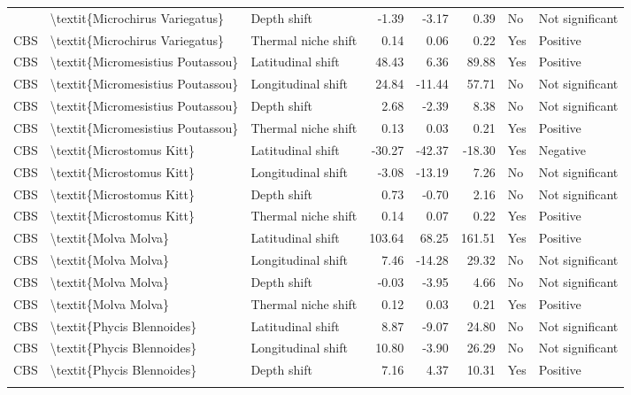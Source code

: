 \begin{longtable}[t]{lllrrrll}
{{CBS & \textbackslash{}textit\{Microchirus Variegatus\} & Depth shift & -1.39 & -3.17 & 0.39 & No & Not significant\\
CBS & \textbackslash{}textit\{Microchirus Variegatus\} & Thermal niche shift & 0.14 & 0.06 & 0.22 & Yes & Positive\\
CBS & \textbackslash{}textit\{Micromesistius Poutassou\} & Latitudinal shift & 48.43 & 6.36 & 89.88 & Yes & Positive\\
CBS & \textbackslash{}textit\{Micromesistius Poutassou\} & Longitudinal shift & 24.84 & -11.44 & 57.71 & No & Not significant\\
\addlinespace
CBS & \textbackslash{}textit\{Micromesistius Poutassou\} & Depth shift & 2.68 & -2.39 & 8.38 & No & Not significant\\
CBS & \textbackslash{}textit\{Micromesistius Poutassou\} & Thermal niche shift & 0.13 & 0.03 & 0.21 & Yes & Positive\\
CBS & \textbackslash{}textit\{Microstomus Kitt\} & Latitudinal shift & -30.27 & -42.37 & -18.30 & Yes & Negative\\
CBS & \textbackslash{}textit\{Microstomus Kitt\} & Longitudinal shift & -3.08 & -13.19 & 7.26 & No & Not significant\\
CBS & \textbackslash{}textit\{Microstomus Kitt\} & Depth shift & 0.73 & -0.70 & 2.16 & No & Not significant\\
\addlinespace
CBS & \textbackslash{}textit\{Microstomus Kitt\} & Thermal niche shift & 0.14 & 0.07 & 0.22 & Yes & Positive\\
CBS & \textbackslash{}textit\{Molva Molva\} & Latitudinal shift & 103.64 & 68.25 & 161.51 & Yes & Positive\\
CBS & \textbackslash{}textit\{Molva Molva\} & Longitudinal shift & 7.46 & -14.28 & 29.32 & No & Not significant\\
CBS & \textbackslash{}textit\{Molva Molva\} & Depth shift & -0.03 & -3.95 & 4.66 & No & Not significant\\
CBS & \textbackslash{}textit\{Molva Molva\} & Thermal niche shift & 0.12 & 0.03 & 0.21 & Yes & Positive\\
\addlinespace
CBS & \textbackslash{}textit\{Phycis Blennoides\} & Latitudinal shift & 8.87 & -9.07 & 24.80 & No & Not significant\\
CBS & \textbackslash{}textit\{Phycis Blennoides\} & Longitudinal shift & 10.80 & -3.90 & 26.29 & No & Not significant\\
CBS & \textbackslash{}textit\{Phycis Blennoides\} & Depth shift & 7.16 & 4.37 & 10.31 & Yes & Positive\\
}}
\end{longtable}

